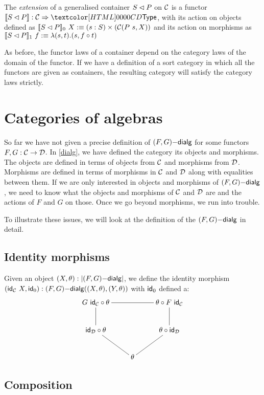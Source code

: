 \begin{definition}
  The \emph{extension} of a generalised container $S \lhd P$ on
  $\mathcal{C}$ is a functor $\context{\cont{S}{P}} : \Func{\Cc}{\Type}$, with
  its action on objects defined as
  $\llbracket S \lhd P \rrbracket_0\ X :\equiv (s : S) \times (\mathcal{C}(P\ s, X))$
  and its action on morphisms as
  $\llbracket S \lhd P \rrbracket_1\ f :\equiv \lambda (s , t) . (s , f \circ
  t)$
\end{definition}

As before, the functor laws of a container depend on the category laws
of the domain of the functor. If we have a definition of a sort
category in which all the functors are given as containers, the
resulting category will satisfy the category laws strictly.


\section{Categories of algebras}

So far we have not given a precise definition of $(F,G)\mathsf{-dialg}$ for
some functors $F, G : \mathcal{C} \to \mathcal{D}$. In \cref{dialg}, we have defined
the category its objects and morphisms. The objects are defined in
terms of objects from $\mathcal{C}$ and morphisms from $\mathcal{D}$. Morphisms are
defined in terms of morphisms in $\mathcal{C}$ and $\mathcal{D}$ along with equalities
between them. If we are only interested in objects and morphisms of
$(F,G)\mathsf{-dialg}$, we need to know what the objects and morphisms of
$\mathcal{C}$ and $\mathcal{D}$ are and the actions of $F$ and $G$ on those. Once we
go beyond morphisms, we run into trouble.

To illustrate these issues, we will look at the definition of the
$(F,G)\mathsf{-dialg}$ in detail. 

\subsection{Identity morphisms}

Given an object $(X,\theta) : | (F,G)\mathsf{-dialg} |$, we define the
identity morphism
$(\mathsf{id}_{\mathcal{C}}\ X , \mathsf{id}_0) : (F,G)\mathsf{-dialg}((X,\theta),(Y,\theta))$ with
$\mathsf{id}_0$ defined a:
$$
\xymatrix{
G\ \id_\Cc \circ \theta
\ar@{-}[rr]
\ar@{-}[d]
&
&\theta \circ F\ \id_\Cc
\ar@{-}[d]
\\
\id_\Dd \circ \theta
\ar@{-}[dr]
&
&\theta \circ \id_\Dd
\ar@{-}[dl]
\\
&\theta
&
}
$$

\subsection{Composition}

